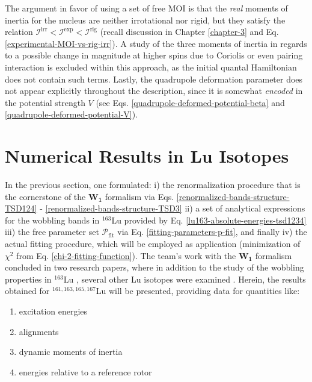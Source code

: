 The argument in favor of using a set of free MOI is that the \emph{real} moments of inertia for the nucleus are neither irrotational nor rigid, but they satisfy the relation $\mathcal{I}^\text{irr}<\mathcal{I}^\text{exp}<\mathcal{I}^\text{rig}$ (recall discussion in Chapter \ref{chapter-3} and Eq. \ref{experimental-MOI-vs-rig-irr}). A study of the three moments of inertia in regards to a possible change in magnitude at higher spins due to Coriolis or even pairing interaction is excluded within this approach, as the initial quantal Hamiltonian does not contain such terms. Lastly, the quadrupole deformation parameter does not appear explicitly throughout the description, since it is somewhat \emph{encoded} in the potential strength $V$ (see Eqs. \ref{quadrupole-deformed-potential-beta} and \ref{quadrupole-deformed-potential-V}).

\section{Numerical Results in Lu Isotopes}

In the previous section, one formulated: i) the renormalization procedure that is the cornerstone of the $\mathbf{W_1}$ formalism via Eqs. \ref{renormalized-bands-structure-TSD124} - \ref{renormalized-bands-structure-TSD3} ii) a set of analytical expressions for the wobbling bands in $^{163}$Lu provided by Eq. \ref{lu163-absolute-energies-tsd1234} iii) the free parameter set $\mathcal{P}_\text{fit}$ via Eq. \ref{fitting-parameters-p-fit}, and finally iv) the actual fitting procedure, which will be employed as application (minimization of $\chi^2$ from Eq. \ref{chi-2-fitting-function}). The team's work with the $\mathbf{W_1}$ formalism concluded in two research papers, where in addition to the study of the wobbling properties in $^{163}$Lu \cite{raduta2020towards}, several other Lu isotopes were examined \cite{raduta2020approach}. Herein, the results obtained for $^{161,163,165,167}$Lu will be presented, providing data for quantities like:
\begin{enumerate}
    \item excitation energies
    \item alignments
    \item dynamic moments of inertia
    \item energies relative to a reference rotor
\end{enumerate}

